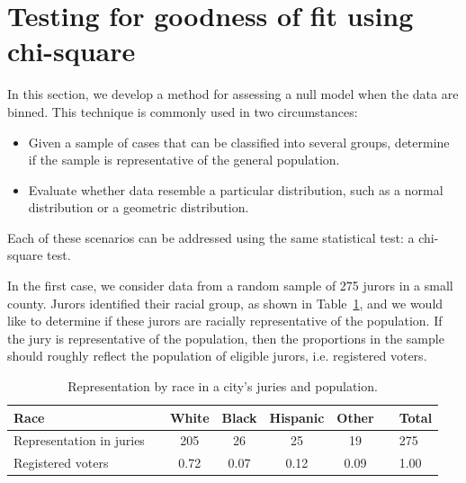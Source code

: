 \section[Testing for goodness of fit using chi-square]{Testing for goodness of fit using chi-square  }

\label{oneWayChiSquare}

In this section, we develop a method for assessing a null model when the data are binned.
This technique is commonly used in two circumstances:
\begin{itemize}
\setlength{\itemsep}{0mm}
\item Given a sample of cases that can be classified into several groups, determine if the sample is representative of the general population.
\item Evaluate whether data resemble a particular distribution, such as a normal distribution or a geometric distribution.
\end{itemize}
Each of these scenarios can be addressed using the same statistical test: a chi-square test.


In the first case, we consider data from a random sample of 275 jurors in a small county. Jurors identified their racial group, as shown in Table~\ref{juryRepresentationAndCityRepresentationForRace}, and we would like to determine if these jurors are racially representative of the population. If the jury is representative of the population, then the proportions in the sample should roughly reflect the population of eligible jurors, i.e. registered voters.

\begin{table}[h]
\centering
\begin{tabular}{ll ccc c ll}
\hline
Race	 & \hspace{2mm} & White & Black & Hispanic & Other & \hspace{2mm} & Total \\
\hline
Representation in juries &	& 205 & 26 & 25 & 19 & & 275 \\
Registered voters	 & 		& 0.72 & 0.07 & 0.12 & 0.09 & & 1.00 \\
\hline
\end{tabular}
\caption{Representation by race in a city's juries and population.}
\label{juryRepresentationAndCityRepresentationForRace}
\end{table}

